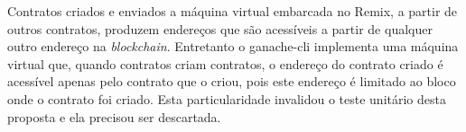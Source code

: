 \documentclass[tcc,capa]{texufpel}
\begin{document}
        Contratos criados e enviados a máquina virtual embarcada no Remix, a partir de outros contratos, produzem endereços que são acessíveis a partir de qualquer outro endereço na \textit{blockchain}. Entretanto o ganache-cli implementa uma máquina virtual que, quando contratos criam contratos, o endereço do contrato criado é acessível apenas pelo contrato que o criou, pois este endereço é limitado ao bloco onde o contrato foi criado. Esta particularidade invalidou o teste unitário desta proposta e ela precisou ser descartada.


 

%

\annex




\end{document}
